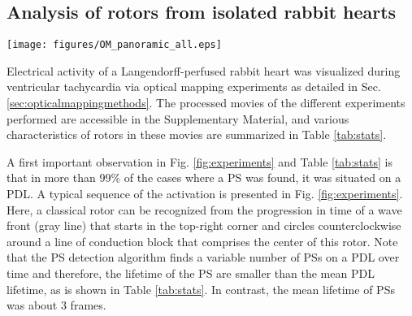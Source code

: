 \documentclass[aps,pre,amsfonts,amssymb,amsmath,twocolumn, superscriptaddress]{revtex4-1}
\newcommand{\phiact}{\ensuremath{\phi_{\rm act}}}
\newcommand{\phiarr}{\ensuremath{\phi_{\rm arr}}}
\begin{document}
\subsection{Analysis of rotors from isolated rabbit hearts}
\label{sec:experiment}


\begin{figure*}[t]%
\centering
\texttt{[image: figures/OM\_panoramic\_all.eps]}
\caption{Analysis of two-sided optical mapping data in rabbit hearts during ventricular tachycardia. Left column: normalized optical intensity (transmembrane voltage) $V$, together with WF ($V=0.5, \dot{V}>0$) and wave back ($V=0.5, \dot{V} < 0$). Middle column: same data series, $\phiact$ computed with $R$ the Hilbert transform of $V$, with PSs and PDLs computed from $\phiact$. Right column: colormap indicates $\phiarr$, computed with $\tau = 99$\,ms, equal to the inverse dominant frequency. PSs and PDLs computed from $\phiarr$ are also shown. PS detection was done using the $2\times 2 + 4\times 4$ method of \citep{Kuklik:2017}. 
\label{fig:experiments}
}
\end{figure*}

Electrical activity of a Langendorff-perfused rabbit heart was visualized during ventricular tachycardia via optical mapping experiments \citep{Kulkarni:2018} as detailed in Sec. \ref{sec:opticalmappingmethods}.
The processed movies of the different experiments performed are accessible in the Supplementary Material, and various characteristics of rotors in these movies are summarized in Table \ref{tab:stats}.

A first important observation in Fig. \ref{fig:experiments} and Table \ref{tab:stats} is that in more than 99\% of the cases where a PS was found, it was situated on a PDL. A typical sequence of the activation is presented in Fig. \ref{fig:experiments}. Here, a classical rotor can be recognized from the progression in time of a wave front (gray line) that starts in the top-right corner and circles counterclockwise around a line of conduction block that comprises the center of this rotor. Note that the PS detection algorithm finds a variable number of PSs on a PDL over time and therefore, the lifetime of the PS are smaller than the mean PDL lifetime, as is shown in Table \ref{tab:stats}. In contrast, the mean lifetime of PSs was about 3 frames. 
\end{document}
